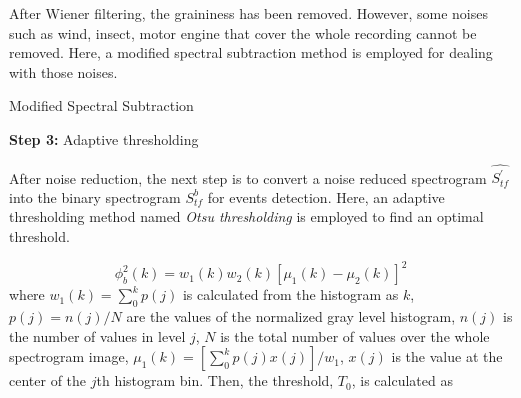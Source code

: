 \noindent After Wiener filtering, the graininess has been removed. However, some noises such as wind, insect, motor engine that cover the whole recording cannot be removed. Here, a modified spectral subtraction method is employed for dealing with those noises. 


\begin{algorithm}
\DontPrintSemicolon
{}

\caption{Modified Spectral Subtraction\label{IR}}

\end{algorithm}

\noindent \textbf{Step 3:} Adaptive thresholding

\noindent After noise reduction, the next step is to convert a noise reduced spectrogram $\hat{S^{'}_{tf}}$ into the binary spectrogram $S^{b}_{tf}$ for events detection. Here, an adaptive thresholding method named \textit{Otsu thresholding} \cite{otsu1975threshold} is employed to find an optimal threshold.

\begin{equation}
\phi_{b}^{2}(k)=w_{1}(k)w_{2}(k)[\mu_{1}(k)-\mu_{2}(k)]^{2}
\end{equation}
\noindent where $w_{1}(k)=\sum_{0}^{k}p(j)$ is calculated from the histogram as $k$, $p(j)=n(j)/N$ are the values of the normalized gray level histogram, $n(j)$ is the number of values in level $j$, $N$ is the total number of values over the whole spectrogram image, $\mu_{1}(k)=[\sum_{0}^{k}p(j)x(j)]/w_{1}$, $x(j)$ is the value at the center of the $j$th histogram bin. Then, the threshold, $T_{0}$, is calculated as

